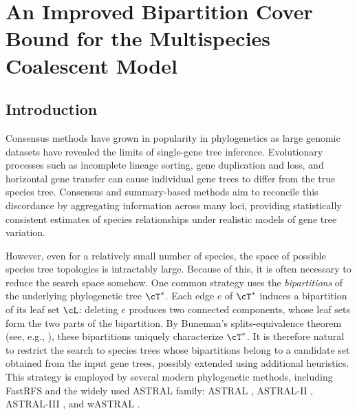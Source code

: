 \chapter[Improved Bipartition Cover Bound]{An Improved Bipartition Cover Bound for the Multispecies Coalescent Model}
\setcounter{secnumdepth}{2}

\section{Introduction}
\label{sec:introduction}

Consensus methods have grown in popularity in phylogenetics as
large genomic datasets have revealed the limits of single-gene
tree inference. Evolutionary processes such as incomplete lineage
 sorting, gene duplication and loss, and horizontal gene transfer
 can cause individual gene trees to differ from the true species
 tree. Consensus and summary-based methods aim to reconcile this
  discordance by aggregating information across many loci,
  providing statistically consistent estimates of species
  relationships under realistic models of gene tree variation.

However, even for a relatively small number of species, the space of possible species tree
topologies is intractably large. Because of this, it is often necessary to reduce the
search space somehow. One common strategy uses the \emph{bipartitions} of the underlying phylogenetic tree $\cT^*$.
Each edge $e$ of $\cT^*$ induces a bipartition of its leaf set $\cL$: deleting $e$ produces two connected components,
whose leaf sets form the two parts of the bipartition. By Buneman's splits-equivalence
theorem (see, e.g., \cite[Theorem~3.1.4]{semple2003_phylogenetics}), these bipartitions uniquely
characterize $\cT^*$. It is therefore natural to restrict the search to species trees whose
bipartitions belong to a candidate set obtained from the input gene trees, possibly extended
using additional heuristics. This strategy is employed by several modern phylogenetic
methods, including FastRFS
\cite{vachaspati2017_fastrfs_robinson_foulds_supertrees} and the widely used ASTRAL
family: ASTRAL \cite{mirarab2014_astral_species_tree_estimation}, ASTRAL-II
\cite{mirarab2015_astral_ii_species_tree_estimation}, ASTRAL-III
\cite{zhang2018_astral_iii_species_tree_reconstruction}, and wASTRAL
\cite{zhang2022_weighting_gene_tree_uncertainty}.

